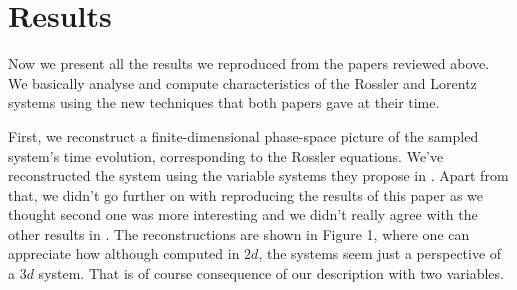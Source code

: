\documentclass[10pt]{article}
\begin{document}
\section{Results}

Now we present all the results we reproduced from the papers reviewed above. We basically analyse and compute characteristics of the Rossler and Lorentz systems using the new techniques that both papers gave at their time.

First, we reconstruct a finite-dimensional phase-space picture of the sampled system's time evolution, corresponding to the Rossler equations. We've reconstructed the system using the variable systems they propose in \cite{paper1}. Apart from that, we didn't go further on with reproducing the results of this paper as we thought second one was more interesting and we didn't really agree with the other results in \cite{paper1}. The reconstructions are shown in Figure 1, where one can appreciate how although computed in $2d$, the systems seem just a perspective of a $3d$ system. That is of course consequence of our description with two variables.
\end{document}
